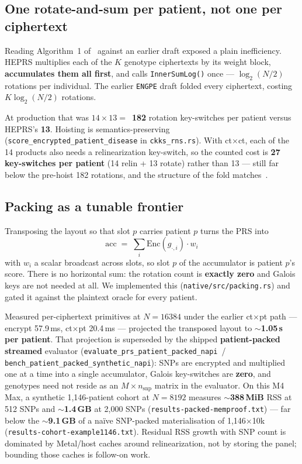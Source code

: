 \documentclass[11pt,a4paper]{article}
\newcommand{\engpe}{\texttt{ENGPE}}
\DeclareRobustCommand{\code}[1]{\texttt{#1}}
\DeclareRobustCommand{\file}[1]{\texttt{#1}}
\newcommand{\longcode}[1]{{\urlstyle{tt}\nolinkurl{#1}}}
\begin{document}
\subsection{One rotate-and-sum per patient, not one per ciphertext}
\label{sec:hoist}

Reading Algorithm~1 of~\cite{knight2026heprs} against an earlier draft exposed a
plain inefficiency. HEPRS multiplies each of the $K$ genotype ciphertexts by its
weight block, \textbf{accumulates them all first}, and calls \code{InnerSumLog()}
once --- $\log_2(N/2)$ rotations per individual. The earlier \engpe{} draft folded
every ciphertext, costing $K\log_2(N/2)$ rotations.

At production that was $14\times 13 =$~\textbf{182} rotation key-switches per
patient versus HEPRS's \textbf{13}. Hoisting is semantics-preserving
(\code{score\_encrypted\_patient\_disease} in \file{ckks\_rns.rs}). With
ct$\times$ct, each of the 14 products also needs a relinearization key-switch, so
the counted cost is \textbf{27 key-switches per patient} (14 relin + 13 rotate)
rather than 13 --- still far below the pre-hoist 182 rotations, and the structure
of the fold matches~\cite{knight2026heprs}.

\subsection{Packing as a tunable frontier}
\label{sec:packing}

Transposing the layout so that slot $p$ carries patient $p$ turns the PRS into
\begin{equation}
\label{eq:patient-pack}
\mathrm{acc} \;=\; \sum_i \mathrm{Enc}(g_{\cdot,i}) \cdot w_i
\end{equation}
with $w_i$ a scalar broadcast across slots, so slot $p$ of the accumulator is
patient $p$'s score. There is no horizontal sum: the rotation count is
\textbf{exactly zero} and Galois keys are not needed at all. We implemented this
(\file{native/src/packing.rs}) and gated it against the plaintext oracle for every
patient.

Measured per-ciphertext primitives at $N = 16384$ under the earlier ct$\times$pt
path --- encrypt 57.9\,ms, ct$\times$pt 20.4\,ms --- projected the transposed
layout to $\sim$\textbf{1.05\,s per patient}. That projection is superseded by the
shipped \textbf{patient-packed streamed} evaluator
(\longcode{evaluate_prs_patient_packed_napi}~/~
\longcode{bench_patient_packed_synthetic_napi}): SNPs are encrypted and multiplied
one at a time into a single accumulator, Galois key-switches are \textbf{zero}, and
genotypes need not reside as an $M\times n_{\mathrm{snp}}$ matrix in the
evaluator. On this M4 Max, a synthetic 1{,}146-patient cohort at $N{=}8192$
measures \textbf{$\sim$388\,MiB} RSS at 512 SNPs and \textbf{$\sim$1.4\,GB} at
2{,}000 SNPs (\file{results-packed-memproof.txt}) --- far below the
\textbf{$\sim$9.1\,GB} of a na\"ive SNP-packed materialisation of 1{,}146$\times$10k
(\file{results-cohort-example1146.txt}). Residual RSS growth with SNP count is
dominated by Metal/host caches around relinearization, not by storing the panel;
bounding those caches is follow-on work.
\end{document}

